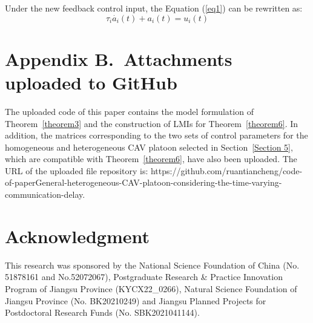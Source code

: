 \documentclass[a4paper]{cas-sc}
\begin{document}
Under the new feedback control input, the Equation (\ref{eq1}) can be rewritten as:
\begin{equation}
  \tau_i\dot{a_i}\left(t\right)+a_i\left(t\right)=u_i(t)
  \label{eqapp10}
\end{equation}





\section*{Appendix B.~Attachments uploaded to GitHub}
\label{AppendixB}
The uploaded code of this paper contains the model formulation of Theorem~\ref{theorem3} and the construction of LMIs for Theorem~\ref{theorem6}. In addition, the matrices corresponding to the two sets of control parameters for the homogeneous and heterogeneous CAV platoon selected in Section~\ref{Section 5}, which are compatible with Theorem~\ref{theorem6}, have also been uploaded. The URL of the uploaded file repository is:
https://github.com/ruantiancheng/code-of-paperGeneral-heterogeneous-CAV-platoon-considering-the-time-varying-communication-delay.

\printcredits

\section*{Acknowledgment}

This research was sponsored by the National Science Foundation of China (No. 51878161 and No.52072067), Postgraduate Research \& Practice Innovation Program of Jiangsu Province (KYCX22\_0266), Natural Science Foundation of Jiangsu Province (No. BK20210249) and Jiangsu Planned Projects for Postdoctoral Research Funds (No. SBK2021041144).

% 





\end{document}
